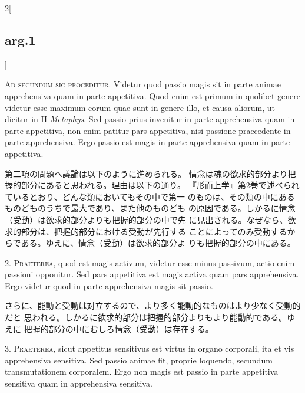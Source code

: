 \documentclass[paper=a4paper,fontsize=10pt,jafontsize=9pt,titlepage]{jlreq}
\begin{document}
\begin{paracol}{2}[\subsection{arg.1}]

{\scshape Ad secundum sic proceditur}. Videtur quod passio magis sit in parte
 animae apprehensiva quam in parte appetitiva. Quod enim est primum in
 quolibet genere videtur esse maximum eorum quae sunt in genere illo, et
 causa aliorum, ut dicitur in II {\itshape Metaphys}. Sed passio prius invenitur in
 parte apprehensiva quam in parte appetitiva, non enim patitur pars
 appetitiva, nisi passione praecedente in parte apprehensiva. Ergo
 passio est magis in parte apprehensiva quam in parte appetitiva.

\switchcolumn

第二項の問題へ議論は以下のように進められる。
情念は魂の欲求的部分より把握的部分にあると思われる。理由は以下の通り。
『形而上学』第2巻で述べられているとおり、どんな類においてもその中で第一
 のものは、その類の中にあるものどものうちで最大であり、また他のものども
 の原因である。しかるに情念（受動）は欲求的部分よりも把握的部分の中で先
 に見出される。なぜなら、欲求的部分は、把握的部分における受動が先行する
 ことによってのみ受動するからである。ゆえに、情念（受動）は欲求的部分よ
 りも把握的部分の中にある。


2. {\scshape Praeterea}, quod est magis activum, videtur esse minus passivum, actio
 enim passioni opponitur. Sed pars appetitiva est magis activa quam pars
 apprehensiva. Ergo videtur quod in parte apprehensiva magis sit passio.

\switchcolumn

さらに、能動と受動は対立するので、より多く能動的なものはより少なく受動的だと
 思われる。しかるに欲求的部分は把握的部分よりもより能動的である。ゆえに
 把握的部分の中にむしろ情念（受動）は存在する。


3. {\scshape Praeterea}, sicut appetitus sensitivus est virtus in organo
 corporali, ita et vis apprehensiva sensitiva. Sed passio animae fit,
 proprie loquendo, secundum transmutationem corporalem. Ergo non magis
 est passio in parte appetitiva sensitiva quam in apprehensiva
 sensitiva.


\end{paracol}
\end{document}
